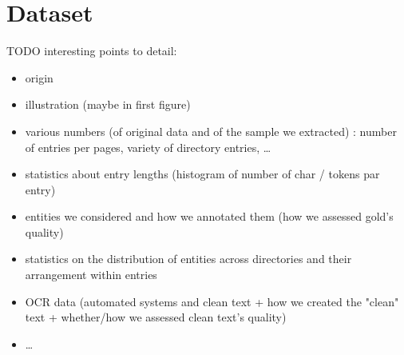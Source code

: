 \section{Dataset}

TODO interesting points to detail:
\begin{itemize}
    \item origin
    \item illustration (maybe in first figure)
    \item various numbers (of original data and of the sample we extracted) : number of entries per pages, variety of directory entries, \dots
    \item statistics about entry lengths (histogram of number of char / tokens par entry)
    \item entities we considered and how we annotated them (how we assessed gold's quality)
    \item statistics on the distribution of entities across directories and their arrangement within entries
    \item OCR data (automated systems and clean text + how we created the "clean" text + whether/how we assessed clean text's quality)
    
    \item \dots
\end{itemize}
